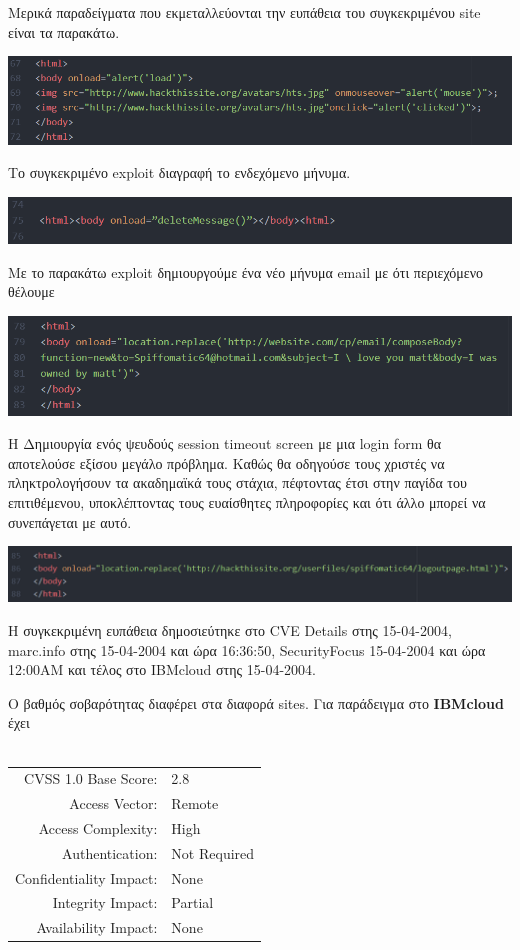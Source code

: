 \noindent
Μερικά παραδείγματα που εκμεταλλεύονται την ευπάθεια του συγκεκριμένου site είναι τα παρακάτω. 
\begin{center}
			\includegraphics[width=1\textwidth]{image/23.PNG}		
\end{center}
\noindent
Το συγκεκριμένο exploit διαγραφή το ενδεχόμενο μήνυμα.
\begin{center}
			\includegraphics[width=1\textwidth]{image/24.PNG}		
\end{center}
\noindent
Με το παρακάτω exploit δημιουργούμε ένα νέο μήνυμα email με ότι περιεχόμενο θέλουμε
\begin{center}
			\includegraphics[width=1\textwidth]{image/25.PNG}		
\end{center}
\noindent
Η Δημιουργία ενός ψευδούς session timeout screen με μια login form θα αποτελούσε εξίσου μεγάλο πρόβλημα. Καθώς θα οδηγούσε τους χριστές να πληκτρολογήσουν τα ακαδημαϊκά τους στάχια, πέφτοντας έτσι στην παγίδα του επιτιθέμενου, υποκλέπτοντας τους ευαίσθητες πληροφορίες και ότι άλλο μπορεί να συνεπάγεται με αυτό.
\begin{center}
			\includegraphics[width=1\textwidth]{image/26.PNG}		
\end{center}
\noindent
Η συγκεκριμένη ευπάθεια δημοσιεύτηκε στο CVE Details στης 15-04-2004, marc.info στης 15-04-2004 και ώρα 16:36:50, SecurityFocus 15-04-2004 και ώρα 12:00ΑΜ και τέλος  στο ΙΒΜcloud στης 15-04-2004. 

\noindent
Ο βαθμός σοβαρότητας διαφέρει στα διαφορά sites. Για παράδειγμα στο \textbf{ΙΒΜcloud} έχει 
\\
\\
\begin{tabular}{rl}
\hline
CVSS 1.0 Base Score: & 2.8 \\
Access Vector: 	& Remote \\
Access Complexity: &	High \\ 
Authentication: & Not Required \\
Confidentiality Impact: & None \\
Integrity Impact: & Partial \\ 
Availability Impact: & None \\
\hline
\end{tabular}



